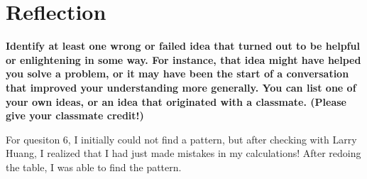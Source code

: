\documentclass[article, 12pt]{article}
\theoremstyle{definition}
\begin{document}
    \section{Reflection}
    \textbf{Identify at least one wrong or failed idea that turned out to be helpful or enlightening in some way. For instance, that idea might have helped you solve a problem, or it may have been the start of a conversation that improved your understanding more generally. You can list one of your own ideas, or an idea that originated with a classmate. (Please give your classmate credit!)}

    For quesiton 6, I initially could not find a pattern, but after checking with Larry Huang, I realized that I had just made mistakes in my calculations! After redoing the table, I was able to find the pattern.
\end{document}
